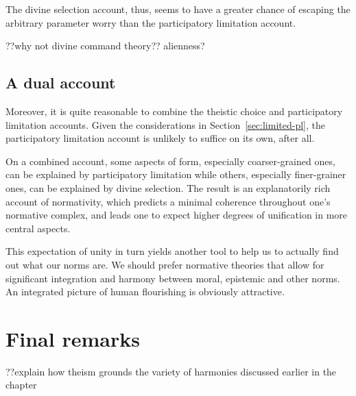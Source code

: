 The divine selection account, thus, seems to have a greater chance of escaping the arbitrary parameter worry than the 
participatory limitation account.

??why not divine command theory?? alienness?

\subsection{A dual account}
Moreover, it is quite reasonable to combine the theistic choice and participatory limitation accounts. Given the considerations in 
Section~\ref{sec:limited-pl}, the participatory limitation account is unlikely to suffice on its own, after all.

On a combined account, some aspects of form, especially coarser-grained ones, can be explained by participatory 
limitation while others, especially finer-grainer ones, can be explained by divine selection. The result is an explanatorily rich account of 
normativity, which predicts a minimal coherence throughout one's normative complex, and leads one to expect higher degrees of unification
in more central aspects.

This expectation of unity in turn yields another tool to help us to actually find out what our norms are. We should prefer normative theories
that allow for significant integration and harmony between moral, epistemic and other norms. An integrated picture of human flourishing
is obviously attractive.

\section{Final remarks}
??explain how theism grounds the variety of harmonies discussed earlier in the chapter

\chaptertail

